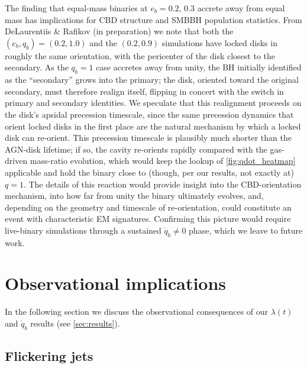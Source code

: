\documentclass[fleqn,usenatbib]{mnras}
\begin{document}
The finding that equal-mass binaries at $e_b = 0.2, \, 0.3$ accrete away from equal mass has implications for CBD structure and SMBBH population statistics. From DeLaurentiis \& Rafikov (in preparation) we note that both the $(e_b, q_b) = (0.2, 1.0)$ and the $(0.2, 0.9)$ simulations have locked disks in roughly the same orientation, with the pericenter of the disk closest to the secondary. As the $q_b = 1$ case accretes away from unity, the BH initially identified as the ``secondary'' grows into the primary; the disk, oriented toward the original secondary, must therefore realign itself, flipping in concert with the switch in primary and secondary identities. We speculate that this realignment proceeds on the disk's apsidal precession timescale, since the same precession dynamics that orient locked disks in the first place are the natural mechanism by which a locked disk can re-orient. This precession timescale is plausibly much shorter than the AGN-disk lifetime; if so, the cavity re-orients rapidly compared with the gas-driven mass-ratio evolution, which would keep the lookup of \autoref{fig:qdot_heatmap} applicable and hold the binary close to (though, per our results, not exactly at) $q = 1$. The details of this reaction would provide insight into the CBD-orientation mechanism, into how far from unity the binary ultimately evolves, and, depending on the geometry and timescale of re-orientation, could constitute an event with characteristic EM signatures. Confirming this picture would require live-binary simulations through a sustained $\dot{q}_b \neq 0$ phase, which we leave to future work.

\section{Observational implications}\label{sec:observations}
In the following section we discuss the observational consequences of our $\lambda(t)$ and $\dot{q}_b$ results (see \autoref{sec:results}).

\subsection{Flickering jets}
\end{document}
